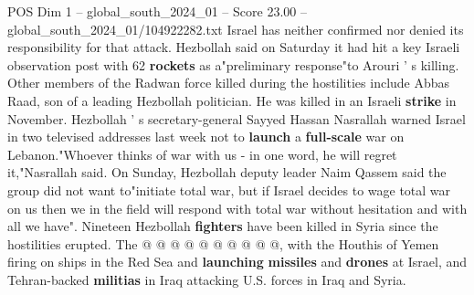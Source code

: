 \begin{textsample}{POS Dim 1 – global\_south\_2024\_01 – Score 23.00 – global\_south\_2024\_01/104922282.txt}
Israel has neither confirmed nor denied its responsibility for that attack.
Hezbollah said on Saturday it had hit a key Israeli observation post with 62 \textbf{rockets} as a"preliminary response"to Arouri ' s killing.
Other members of the Radwan force killed during the hostilities include Abbas Raad, son of a leading Hezbollah politician.
He was killed in an Israeli \textbf{strike} in November.
Hezbollah ' s secretary-general Sayyed Hassan Nasrallah warned Israel in two televised addresses last week not to \textbf{launch} a \textbf{full-scale} war on Lebanon."Whoever thinks of war with us - in one word, he will regret it,"Nasrallah said.
On Sunday, Hezbollah deputy leader Naim Qassem said the group did not want to"initiate total war, but if Israel decides to wage total war on us then we in the field will respond with total war without hesitation and with all we have".
Nineteen Hezbollah \textbf{fighters} have been killed in Syria since the hostilities erupted.
The @ @ @ @ @ @ @ @ @ @, with the Houthis of Yemen firing on ships in the Red Sea and \textbf{launching} \textbf{missiles} and \textbf{drones} at Israel, and Tehran-backed \textbf{militias} in Iraq attacking U.S. forces in Iraq and Syria.

\end{textsample}
